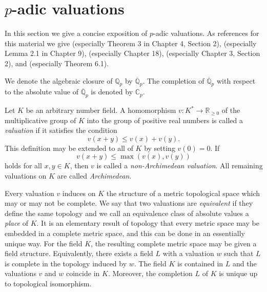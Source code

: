 \documentclass[11pt]{report}
\theoremstyle{definition}
\begin{document}
\section{$p$-adic valuations}
\label{sec:pAdicValuations}

In this section we give a concise exposition of $p$-adic valuations. As references for this material we give \cite{BS} (especially Theorem 3 in Chapter 4, Section 2), \cite{Ca} (especially Lemma 2.1 in Chapter 9), \cite{Has2} (especially Chapter 18), \cite{Ko} (especially Chapter 3, Section 2), and \cite{Nark} (especially Theorem 6.1).

We denote the algebraic closure of $\mathbb{Q}_p$ by $\overline{\mathbb{Q}}_p$. The completion of $\overline{\mathbb{Q}}_p$ with respect to the absolute value of $\overline{\mathbb{Q}}_p$ is denoted by $\mathbb{C}_p$.

Let $K$ be an arbitrary number field. A homomorphism $v: K^* \to \mathbb{R}_{\geq 0}$ of the multiplicative group of $K$ into the group of positive real numbers is called a \textit{valuation} if it satisfies the condition
\[v(x+y) \leq v(x) + v(y).\]
This definition may be extended to all of $K$ by setting $v(0) = 0$. If
\[v(x+y) \leq \max(v(x),v(y))\]
holds for all $x,y \in K$, then $v$ is called a \textit{non-Archimedean valuation}. All remaining valuations on $K$ are called \textit{Archimedean}.

Every valuation $v$ induces on $K$ the structure of a metric topological space which may or may not be complete. We say that two valuations are \textit{equivalent} if they define the same topology and we call an equivalence class of absolute values a \textit{place} of $K$. It is an elementary result of topology that every metric space may be embedded in a complete metric space, and this can be done in an essentially unique way. For the field $K$, the resulting complete metric space may be given a field structure. Equivalently, there exists a field $L$ with a valuation $w$ such that $L$ is complete in the topology induced by $w$. The field $K$ is contained in $L$ and the valuations $v$ and $w$ coincide in $K$. Moreover, the completion $L$ of $K$ is unique up to topological isomorphism.
\end{document}
